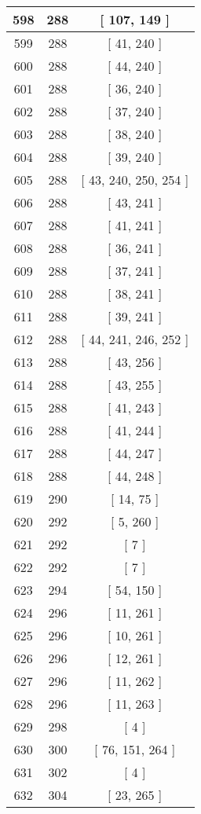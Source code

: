 \begin{center}
\begin{longtable}[H]{|| c c c ||}
\hline
598 & 288 & [ 107, 149 ] \\ 
\hline
599 & 288 & [ 41, 240 ] \\ 
\hline
600 & 288 & [ 44, 240 ] \\ 
\hline
601 & 288 & [ 36, 240 ] \\ 
\hline
602 & 288 & [ 37, 240 ] \\ 
\hline
603 & 288 & [ 38, 240 ] \\ 
\hline
604 & 288 & [ 39, 240 ] \\ 
\hline
605 & 288 & [ 43, 240, 250, 254 ] \\ 
\hline
606 & 288 & [ 43, 241 ] \\ 
\hline
607 & 288 & [ 41, 241 ] \\ 
\hline
608 & 288 & [ 36, 241 ] \\ 
\hline
609 & 288 & [ 37, 241 ] \\ 
\hline
610 & 288 & [ 38, 241 ] \\ 
\hline
611 & 288 & [ 39, 241 ] \\ 
\hline
612 & 288 & [ 44, 241, 246, 252 ] \\ 
\hline
613 & 288 & [ 43, 256 ] \\ 
\hline
614 & 288 & [ 43, 255 ] \\ 
\hline
615 & 288 & [ 41, 243 ] \\ 
\hline
616 & 288 & [ 41, 244 ] \\ 
\hline
617 & 288 & [ 44, 247 ] \\ 
\hline
618 & 288 & [ 44, 248 ] \\ 
\hline
619 & 290 & [ 14, 75 ] \\ 
\hline
620 & 292 & [ 5, 260 ] \\ 
\hline
621 & 292 & [ 7 ] \\ 
\hline
622 & 292 & [ 7 ] \\ 
\hline
623 & 294 & [ 54, 150 ] \\ 
\hline
624 & 296 & [ 11, 261 ] \\ 
\hline
625 & 296 & [ 10, 261 ] \\ 
\hline
626 & 296 & [ 12, 261 ] \\ 
\hline
627 & 296 & [ 11, 262 ] \\ 
\hline
628 & 296 & [ 11, 263 ] \\ 
\hline
629 & 298 & [ 4 ] \\ 
\hline
630 & 300 & [ 76, 151, 264 ] \\ 
\hline
631 & 302 & [ 4 ] \\ 
\hline
632 & 304 & [ 23, 265 ] \\ 

\end{longtable}
\end{center}
